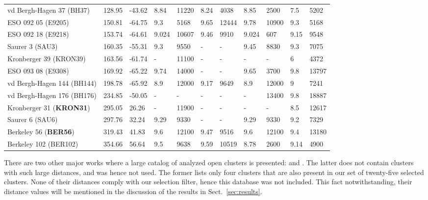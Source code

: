 \documentclass{aa}
\begin{document}
\begin{table}
\begin{tabular}{lllllllllll}
 vd Bergh-Hagen 37 (BH37)    & 128.95 & -43.62    & 8.84  & 11220 & 8.24 
 & 4038  & 8.85  & 2500  & 7.5   & 5202  \\
 ESO 092 05 (E9205)  & 150.81 & -64.75    & 9.3   & 5168  & 9.65  & 12444 &
 9.78  & 10900 & 9.3   & 5168  \\
 ESO 092 18 (E9218)  & 153.74 & -64.61    & 9.024 & 10607 & 9.46  & 9910  &
 9.024 & 607   & 9.15  & 9548  \\
 Saurer 3 (SAU3)   & 160.35 & -55.31    & 9.3   & 9550  & -   & -   & 9.45  &
 8830 & 9.3   & 7075  \\
 Kronberger 39 (KRON39)    & 163.56 & -61.74    & -   & 11100 & -   & -   & -   &
 -   & 6     & 4372  \\
 ESO 093 08 (E9308)  & 169.92 & -65.22    & 9.74  & 14000 & -   & -   & 9.65  &
 3700  & 9.8   & 13797 \\
 vd Bergh-Hagen 144 (BH144)   & 198.78 & -65.92    & 8.9   & 12000 & 9.17
 & 9649  & 8.9   & 12000 & 9     & 7241  \\
 vd Bergh-Hagen 176 (BH176)   & 234.85 & -50.05    & -   & -   & -   & - 
 & -   & 13400 & 9.8   & 18887 \\
 Kronberger 31 (\textbf{KRON31})    & 295.05 & 26.26     & -   & 11900 & -   & -   & -   &
 -   & 8.5   & 12617 \\
 Saurer 6 (SAU6)   & 297.76 & 32.24     & 9.29  & 9330  & -   & -   & 9.29  &
 9330 & 9.2   & 7329  \\
 Berkeley 56 (\textbf{BER56})     & 319.43 & 41.83     & 9.6   & 12100 & 9.47  & 9516  &
 9.6 & 12100 & 9.4   & 13180 \\
 Berkeley 102 (BER102)    & 354.66 & 56.64     & 9.5   & 9638  & 9.59  & 10519 &
 8.78  & 2600  & 9.14  & 4900 \\
 \hline
 \end{tabular}
 \end{table}

 There are two other major works where a large catalog of analyzed open clusters
 is presented: \cite{Lui_2019} and \cite{Dias_2021}. The latter does not contain
 clusters with such large distances, and was hence not used. The former lists
 only four clusters that are also present in our set of twenty-five selected
 clusters. None of their distances comply with our selection filter, hence this
 database was not included. This fact notwithstanding, their distance values will
 be mentioned in the discussion of the results in Sect.~\ref{sec:results}.\\
\end{document}
